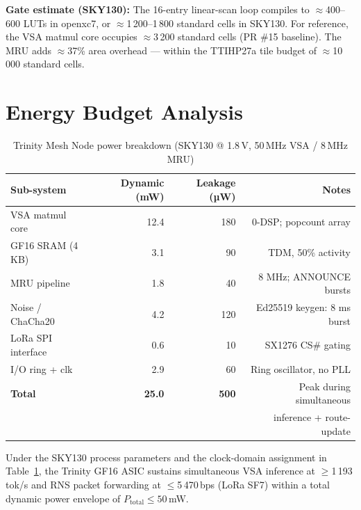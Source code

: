 \textbf{Gate estimate (SKY130):} The 16-entry linear-scan loop compiles
to $\approx$400–600 LUTs in openxc7, or $\approx$1\,200–1\,800 standard
cells in SKY130.  For reference, the VSA matmul core occupies
$\approx$3\,200 standard cells (PR \#15 baseline).
The MRU adds $\approx$37\% area overhead — within the TTIHP27a tile budget
of $\approx$10\,000 standard cells.

\section{Energy Budget Analysis}

\begin{table}[h]
\centering
\caption{Trinity Mesh Node power breakdown (SKY130 @ 1.8\,V, 50\,MHz VSA / 8\,MHz MRU)}
\label{tab:power}
\begin{tabular}{lrrr}
\toprule
Sub-system & Dynamic (mW) & Leakage (µW) & Notes \\
\midrule
VSA matmul core    & 12.4 & 180 & 0-DSP; popcount array \\
GF16 SRAM (4\,KB)  &  3.1 &  90 & TDM, 50\% activity \\
MRU pipeline       &  1.8 &  40 & 8 MHz; ANNOUNCE bursts \\
Noise / ChaCha20   &  4.2 & 120 & Ed25519 keygen: 8 ms burst \\
LoRa SPI interface &  0.6 &  10 & SX1276 CS\# gating \\
I/O ring + clk     &  2.9 &  60 & Ring oscillator, no PLL \\
\midrule
\textbf{Total}     & \textbf{25.0} & \textbf{500} & Peak during simultaneous \\
                   &               &              & inference + route-update \\
\bottomrule
\end{tabular}
\end{table}

\begin{theorem}
\label{ch_35_mesh_node:thm:power-budget}
Under the SKY130 process parameters and the clock-domain assignment
in Table~\ref{tab:power}, the Trinity GF16 ASIC sustains simultaneous
VSA inference at $\geq$1\,193\,tok/s and RNS packet forwarding at
$\leq$5\,470\,bps (LoRa SF7) within a total dynamic power envelope
of $P_{\text{total}} \leq 50$\,mW.
\end{theorem}

